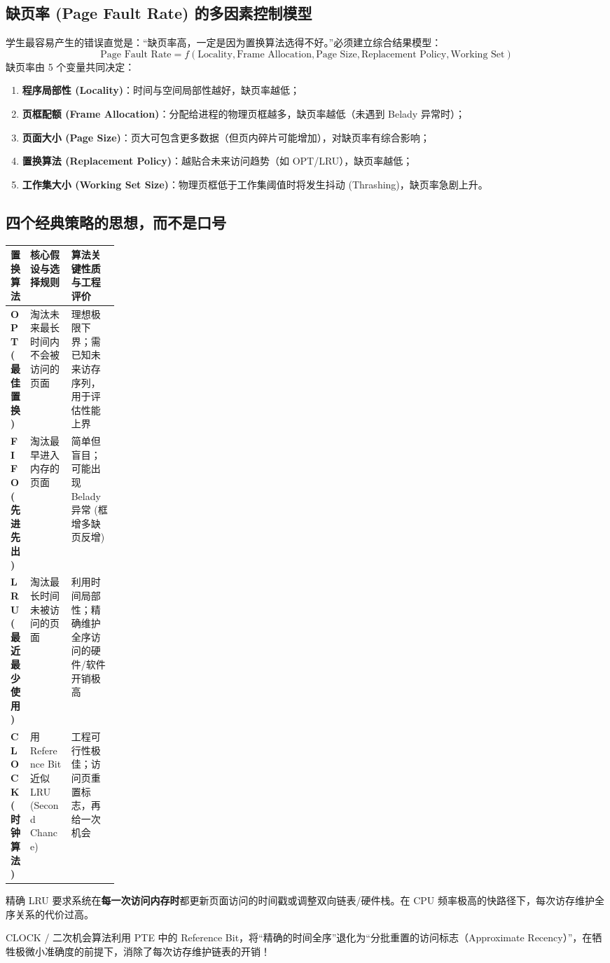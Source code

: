 \documentclass[11pt,a4paper]{ctexart}
\newcommand{\kw}[1]{\textbf{#1}}
\begin{document}
\subsection{缺页率 (Page Fault Rate) 的多因素控制模型}

学生最容易产生的错误直觉是：“缺页率高，一定是因为置换算法选得不好。”必须建立综合结果模型：
\[
\boxed{
\text{Page Fault Rate} = f(
\text{Locality},
\text{Frame Allocation},
\text{Page Size},
\text{Replacement Policy},
\text{Working Set}
)
}
\]
缺页率由 5 个变量共同决定：
\begin{enumerate}
  \item \kw{程序局部性 (Locality)}：时间与空间局部性越好，缺页率越低；
  \item \kw{页框配额 (Frame Allocation)}：分配给进程的物理页框越多，缺页率越低（未遇到 Belady 异常时）；
  \item \kw{页面大小 (Page Size)}：页大可包含更多数据（但页内碎片可能增加），对缺页率有综合影响；
  \item \kw{置换算法 (Replacement Policy)}：越贴合未来访问趋势（如 OPT/LRU），缺页率越低；
  \item \kw{工作集大小 (Working Set Size)}：物理页框低于工作集阈值时将发生抖动 (Thrashing)，缺页率急剧上升。
\end{enumerate}

\subsection{四个经典策略的思想，而不是口号}
\begingroup
\small
\renewcommand{\arraystretch}{1.25}
\setlength{\tabcolsep}{6pt}
\begin{tabularx}{\linewidth}{>{\bfseries}p{0.18\linewidth} X X}
\toprule
置换算法 & 核心假设与选择规则 & 算法关键性质与工程评价\\
\midrule
OPT (最佳置换) & 淘汰未来最长时间内不会被访问的页面 & 理想极限下界；需已知未来访存序列，用于评估性能上界\\
FIFO (先进先出) & 淘汰最早进入内存的页面 & 简单但盲目；可能出现 Belady 异常 (框增多缺页反增)\\
LRU (最近最少使用) & 淘汰最长时间未被访问的页面 & 利用时间局部性；精确维护全序访问的硬件/软件开销极高\\
CLOCK (时钟算法) & 用 Reference Bit 近似 LRU (Second Chance) & 工程可行性极佳；访问页重置标志，再给一次机会\\
\bottomrule
\end{tabularx}
\endgroup

\begin{method}
精确 LRU 要求系统在\kw{每一次访问内存时}都更新页面访问的时间戳或调整双向链表/硬件栈。在 CPU 频率极高的快路径下，每次访存维护全序关系的代价过高。

CLOCK / 二次机会算法利用 PTE 中的 Reference Bit，将“精确的时间全序”退化为“分批重置的访问标志（Approximate Recency）”，在牺牲极微小准确度的前提下，消除了每次访存维护链表的开销！
\end{method}
\end{document}
